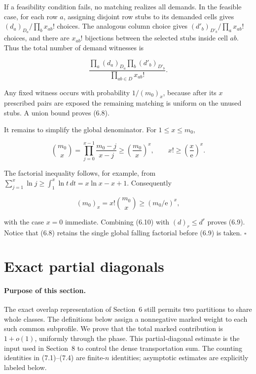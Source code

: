 \documentclass[11pt,reqno]{amsart}
\begin{document}
If a feasibility condition fails, no matching realizes all demands. In the
feasible case, for each row \(a\), assigning disjoint row stubs to its
demanded cells gives
\((d_a)_{D_a}/\prod_bx_{ab}!\) choices.  The analogous column choice
gives \((d'_b)_{D'_b}/\prod_ax_{ab}!\) choices, and there are
\(x_{ab}!\) bijections between the selected stubs inside cell \(ab\).
Thus the total number of demand witnesses is

\[
 \frac{\prod_a(d_a)_{D_a}\prod_b(d'_b)_{D'_b}}
      {\prod_{ab\in D}x_{ab}!}.
\]

Any fixed witness occurs with probability \(1/(m_0)_x\), because after
its \(x\) prescribed pairs are exposed the remaining matching is uniform
on the unused stubs.  A union bound proves (6.8).

It remains to simplify the global denominator.  For \(1\le x\le m_0\),

\[
 \binom{m_0}{x}
 =\prod_{j=0}^{x-1}\frac{m_0-j}{x-j}
 \ge\left(\frac{m_0}{x}\right)^x,
 \qquad
 x!\ge\left(\frac{x}{\mathrm{e}}\right)^x.
\]

The factorial inequality follows, for example, from
\(\sum_{j=1}^x\ln j\ge\int_1^x\ln t\,dt=x\ln x-x+1\).
Consequently

\[
 (m_0)_x=x!\binom{m_0}{x}\ge(m_0/\mathrm{e})^x,          \tag{6.10}
\]

with the case \(x=0\) immediate.  Combining (6.10) with
\((d)_r\le d^r\) proves (6.9). Notice that (6.8) retains the single global falling
factorial before (6.9) is taken. \(\square\)

\section{Exact partial diagonals}\label{exact-partial-diagonals}

\paragraph{Purpose of this section.}
The exact overlap representation of Section~6 still permits two partitions
to share whole classes. The definitions below assign a nonnegative marked
weight to each such common subprofile. We prove that the total marked
contribution is \(1+o(1)\), uniformly through the phase. This
partial-diagonal estimate is the input used in Section~8 to control the
dense transportation sum. The counting identities in (7.1)--(7.4) are
finite-\(n\) identities; asymptotic estimates are explicitly labeled below.
\end{document}
